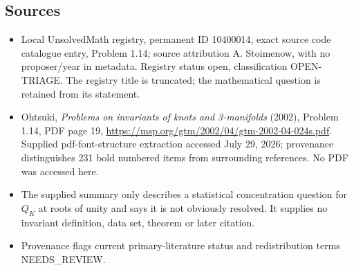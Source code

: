 \documentclass[11pt]{article}
\begin{document}
\subsection{Sources}
\begin{itemize}
\item Local UnsolvedMath registry, permanent ID 10400014, exact source code catalogue entry, Problem 1.14; source attribution A. Stoimenow, with no proposer/year in metadata. Registry status open, classification OPEN-TRIAGE. The registry title is truncated; the mathematical question is retained from its statement.
\item Ohtsuki, \emph{Problems on invariants of knots and 3-manifolds} (2002), Problem 1.14, PDF page 19, \url{https://msp.org/gtm/2002/04/gtm-2002-04-024s.pdf}. Supplied pdf-font-structure extraction accessed July 29, 2026; provenance distinguishes 231 bold numbered items from surrounding references. No PDF was accessed here.
\item The supplied summary only describes a statistical concentration question for $Q_K$ at roots of unity and says it is not obviously resolved. It supplies no invariant definition, data set, theorem or later citation.
\item Provenance flags current primary-literature status and redistribution terms NEEDS\_REVIEW.
\end{itemize}
\end{document}
